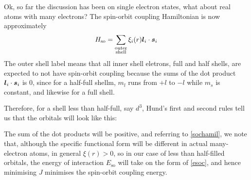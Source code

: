 Ok, so far the discussion has been on single electron states, what about real atoms with many electrons? The spin-orbit coupling Hamiltonian is now approximately
\begin{equation}
 	H_{\mathrm{so}}=\sum_{\substack{\text{outer} \\ \text{shell}}}\xi_i(r)\boldsymbol{l}_i\cdot\boldsymbol{s}_i
\end{equation} 
The outer shell label means that all inner shell eletrons, \ie full and half shells, are expected to not have spin-orbit coupling because the sums of the dot product $\boldsymbol{l}_i\cdot\boldsymbol{s}_i$ is 0, since for a half-full shellm, $m_l$ runs from $+l$ to $-l$ while $m_s$ is constant, and likewise for a full shell.\par
Therefore, for a shell less than half-full, say $d^3$, Hund's first and second rules tell us that the orbitals will look like this:
\begin{center}
\end{center}
The sum of the dot products will be positive, and referring to \cref{sochamil}, we note that, although the specific functional form will be different in actual many-electron atoms, in general $\xi(r)>0$, so in our case of less than half-filled orbitals, the energy of interaction $E_{\mathrm{so}}$ will take on the form of \cref{esoc}, and hence minimising $J$ minimises the spin-orbit coupling energy.\par
